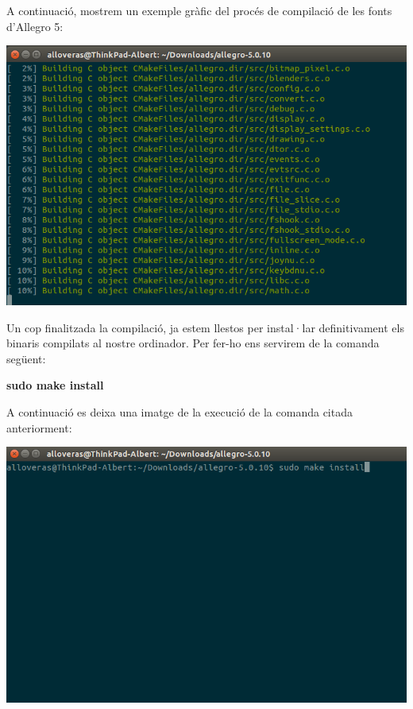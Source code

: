 \documentclass[11pt]{article}
\begin{document}
\noindent A continuació, mostrem un exemple gràfic del procés de compilació de les fonts d'Allegro 5:

\begin{center}
	\includegraphics[scale=0.4]{img/Make_Process.png}
\end{center}

\noindent Un cop finalitzada la compilació, ja estem llestos per instal·lar definitivament els binaris compilats al nostre ordinador. Per fer-ho ens servirem de la comanda següent:

\begin{center}
	\textbf{sudo make install}
\end{center}

\noindent A continuació es deixa una imatge de la execució de la comanda citada anteriorment:
\begin{center}
	\includegraphics[scale=0.4]{img/Make_Install_Command.png}
\end{center}
\end{document}

